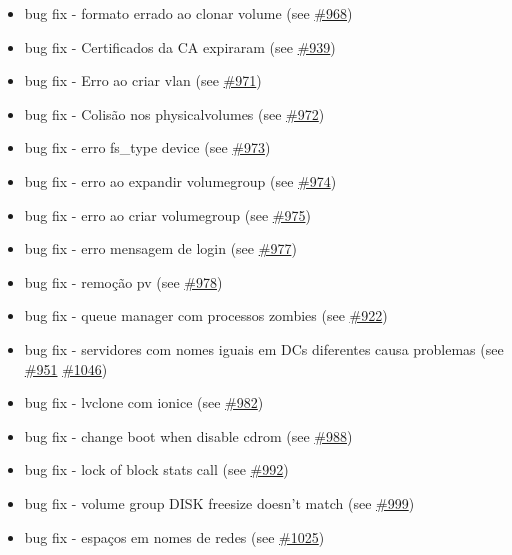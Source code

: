 \begin{itemize}
    \item bug fix - formato errado ao clonar volume (see \href{https://srcmaster.eurotux.com/pm/p/etva/ticket/968}{\#968})
    \item bug fix - Certificados da CA expiraram (see \href{https://srcmaster.eurotux.com/pm/p/etva/ticket/939}{\#939})
    \item bug fix - Erro ao criar vlan (see \href{https://srcmaster.eurotux.com/pm/p/etva/ticket/971}{\#971})
    \item bug fix - Colisão nos physicalvolumes (see \href{https://srcmaster.eurotux.com/pm/p/etva/ticket/972}{\#972})
    \item bug fix - erro fs\_type device (see \href{https://srcmaster.eurotux.com/pm/p/etva/ticket/973}{\#973})
    \item bug fix - erro ao expandir volumegroup (see \href{https://srcmaster.eurotux.com/pm/p/etva/ticket/974}{\#974})
    \item bug fix - erro ao criar volumegroup (see \href{https://srcmaster.eurotux.com/pm/p/etva/ticket/975}{\#975})
    \item bug fix - erro mensagem de login (see \href{https://srcmaster.eurotux.com/pm/p/etva/ticket/977}{\#977})
    \item bug fix - remoção pv (see \href{https://srcmaster.eurotux.com/pm/p/etva/ticket/978}{\#978})
    \item bug fix - queue manager com processos zombies (see \href{https://srcmaster.eurotux.com/pm/p/etva/ticket/922}{\#922})
    \item bug fix - servidores com nomes iguais em DCs diferentes causa problemas (see \href{https://srcmaster.eurotux.com/pm/p/etva/ticket/951}{\#951} \href{https://srcmaster.eurotux.com/pm/p/etva/ticket/1046}{\#1046})
    \item bug fix - lvclone com ionice (see \href{https://srcmaster.eurotux.com/pm/p/etva/ticket/982}{\#982})
    \item bug fix - change boot when disable cdrom (see \href{https://srcmaster.eurotux.com/pm/p/etva/ticket/988}{\#988})
    \item bug fix - lock of block stats call (see \href{https://srcmaster.eurotux.com/pm/p/etva/ticket/992}{\#992})
    \item bug fix - volume group DISK freesize doesn't match (see \href{https://srcmaster.eurotux.com/pm/p/etva/ticket/999}{\#999})
    \item bug fix - espaços em nomes de redes (see \href{https://srcmaster.eurotux.com/pm/p/etva/ticket/1025}{\#1025})

\end{itemize}
